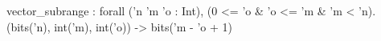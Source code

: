 vector_subrange : forall ('n 'm 'o : Int), (0 <= 'o & 'o <= 'm & 'm < 'n).
  (bits('n), int('m), int('o)) -> bits('m - 'o + 1)